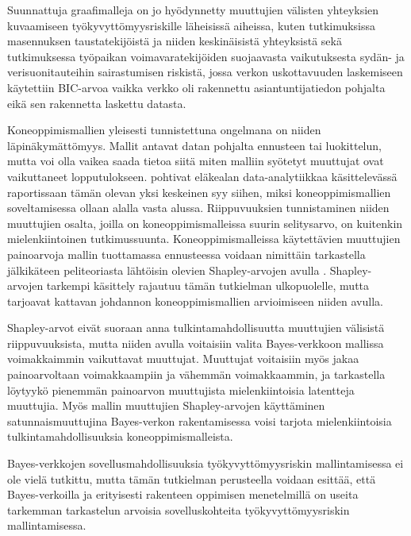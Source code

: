 Suunnattuja graafimalleja on jo hyödynnetty muuttujien välisten yhteyksien kuvaamiseen työkyvyttömyysriskille läheisissä aiheissa, kuten \citet{elovainio_is_2021, elovainio_network_2020} tutkimuksissa masennuksen taustatekijöistä ja niiden keskinäisistä yhteyksistä sekä \citet{xu_workplace_2022} tutkimuksessa työpaikan voimavaratekijöiden suojaavasta vaikutuksesta sydän- ja verisuonitauteihin sairastumisen riskistä, jossa verkon uskottavuuden laskemiseen käytettiin BIC-arvoa vaikka verkko oli rakennettu asiantuntijatiedon pohjalta eikä sen rakennetta laskettu datasta.

Koneoppimismallien yleisesti tunnistettuna ongelmana on niiden läpinäkymättömyys. Mallit antavat datan pohjalta ennusteen tai luokittelun, mutta voi olla vaikea saada tietoa siitä miten malliin syötetyt muuttujat ovat vaikuttaneet lopputulokseen. \citet{adekunle_applied_2021} pohtivat eläkealan data-analytiikkaa käsittelevässä raportissaan tämän olevan yksi keskeinen syy siihen, miksi koneoppimismallien soveltamisessa ollaan alalla vasta alussa. Riippuvuuksien tunnistaminen niiden muuttujien osalta, joilla on koneoppimismalleissa suurin selitysarvo, on kuitenkin mielenkiintoinen tutkimussuunta. Koneoppimismalleissa käytettävien muuttujien painoarvoja mallin tuottamassa ennusteessa voidaan nimittäin tarkastella jälkikäteen peliteoriasta lähtöisin olevien Shapley-arvojen avulla \citep{shapley_7_2020}. Shapley-arvojen tarkempi käsittely rajautuu tämän tutkielman ulkopuolelle, mutta \citet{merrick_explanation_2020} tarjoavat kattavan johdannon koneoppimismallien arvioimiseen niiden avulla. 

Shapley-arvot eivät suoraan anna tulkintamahdollisuutta muuttujien välisistä riippuvuuksista, mutta niiden avulla voitaisiin valita Bayes-verkkoon mallissa voimakkaimmin vaikuttavat muuttujat. Muuttujat voitaisiin myös jakaa painoarvoltaan voimakkaampiin ja vähemmän voimakkaammin, ja tarkastella löytyykö pienemmän painoarvon muuttujista mielenkiintoisia latentteja muuttujia. Myös mallin muuttujien Shapley-arvojen käyttäminen satunnaismuuttujina Bayes-verkon rakentamisessa voisi tarjota mielenkiintoisia tulkintamahdollisuuksia koneoppimismalleista.

Bayes-verkkojen sovellusmahdollisuuksia työkyvyttömyysriskin mallintamisessa ei ole vielä tutkittu, mutta tämän tutkielman perusteella voidaan esittää, että Bayes-verkoilla ja erityisesti rakenteen oppimisen menetelmillä on useita tarkemman tarkastelun arvoisia sovelluskohteita työkyvyttömyysriskin mallintamisessa. 